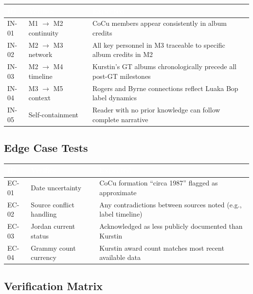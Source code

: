 \documentclass[11pt,letterpaper]{article}
\newcommand{\tableheader}[1]{\textbf{\sffamily\textcolor{white}{#1}}}
\begin{document}
\begin{center}
\begin{tabularx}{\textwidth}{C{1.2cm}L{3.5cm}X}
\toprule
{}
\tableheader{ID} & \tableheader{Verifies} & \tableheader{Expected} \\
\midrule
IN-01 & M1 $\rightarrow$ M2 continuity & CoCu members appear consistently in album credits \\
IN-02 & M2 $\rightarrow$ M3 network & All key personnel in M3 traceable to specific album credits in M2 \\
IN-03 & M2 $\rightarrow$ M4 timeline & Kurstin's GT albums chronologically precede all post-GT milestones \\
IN-04 & M3 $\rightarrow$ M5 context & Rogers and Byrne connections reflect Luaka Bop label dynamics \\
IN-05 & Self-containment & Reader with no prior knowledge can follow complete narrative \\
\bottomrule
\end{tabularx}
\end{center}

\subsection{Edge Case Tests}

\begin{center}
\begin{tabularx}{\textwidth}{C{1.2cm}L{3.5cm}X}
\toprule
{}
\tableheader{ID} & \tableheader{Verifies} & \tableheader{Expected} \\
\midrule
EC-01 & Date uncertainty & CoCu formation ``circa 1987'' flagged as approximate \\
EC-02 & Source conflict handling & Any contradictions between sources noted (e.g., label timeline) \\
EC-03 & Jordan current status & Acknowledged as less publicly documented than Kurstin \\
EC-04 & Grammy count currency & Kurstin award count matches most recent available data \\
\bottomrule
\end{tabularx}
\end{center}

\subsection{Verification Matrix}
\end{document}
